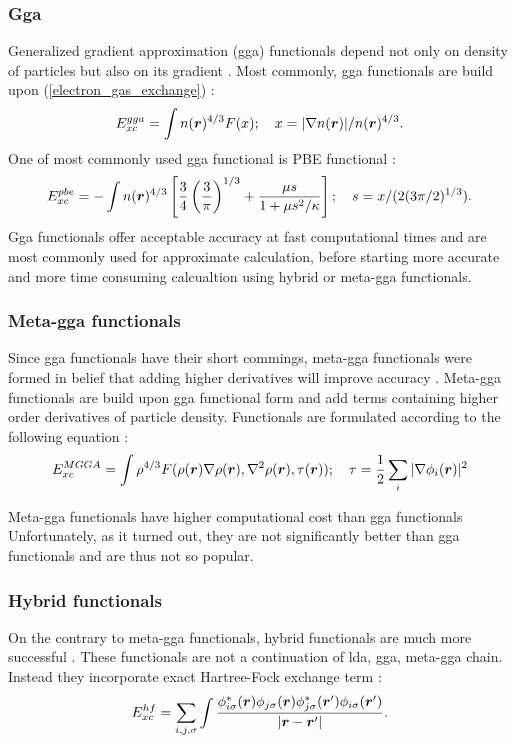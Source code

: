 \documentclass[openany, longbibliography,slovene,a4paper,12pt]{article}
\def\vec#1{\mbox{\boldmath$#1$}}
\begin{document}
\subsubsection{Gga}
Generalized gradient approximation (gga) functionals
depend not only on density of particles but also on its gradient \cite{challenges_den_fun_theor}. Most commonly,
gga functionals are build upon (\ref{electron_gas_exchange}) \cite{challenges_den_fun_theor}:
\begin{equation}
  E_{xc}^{gga}=\int n(\vec r)^{4/3}F(x);\quad x=|\nabla n(\vec r)|/n(\vec r)^{4/3}.
\end{equation}
One of most commonly used gga functional is PBE functional
\cite{challenges_den_fun_theor} \cite{challenges_den_fun_theor}:
\begin{equation}
  E_{xc}^{pbe}=-\int  n(\vec r)^{4/3}\left[ \frac{3}{4}\left(\frac{3}{\pi}\right)^{1/3} + \frac{\mu s}{1+ \mu s^2/\kappa} \right]; \quad s=x/(2(3\pi/2)^{1/3}).
\end{equation}
Gga functionals offer acceptable accuracy at fast computational times and are
most commonly used for approximate calculation, before starting more accurate
and more time consuming calcualtion using hybrid or meta-gga functionals.

\subsubsection{Meta-gga functionals}
Since gga functionals have their short commings, meta-gga functionals were formed
in belief that adding higher derivatives will improve accuracy
\cite{challenges_den_fun_theor}. Meta-gga functionals are build upon gga
functional form and add terms containing higher order derivatives of particle
density. Functionals are formulated according to the following equation
\cite{challenges_den_fun_theor}:
\begin{equation}
  E_{xc}^{MGGA}= \int \rho^{4/3}F(\rho(\vec r) \nabla \rho(\vec r), \nabla^2 \rho(\vec r), \tau(\vec r)); \quad \tau=\frac{1}{2}\sum_i |\nabla \phi_i(\vec r)|^2
   \end{equation}

Meta-gga functionals have higher computational cost than gga functionals
Unfortunately, as it turned out, they are not significantly better than gga
functionals and are thus not so popular.

\subsubsection{Hybrid functionals}
On the contrary to meta-gga functionals, hybrid functionals are much more
successful \cite{challenges_den_fun_theor}. These functionals are not a
continuation of lda, gga, meta-gga chain. Instead they incorporate exact
Hartree-Fock exchange term \cite{challenges_den_fun_theor}:
\begin{equation}
  E^{hf}_{xc}=\sum_ {i,j,\sigma}\int\frac{\phi^*_{i\sigma}(\vec r) \phi_{j\sigma}(\vec r) \phi^*_{j\sigma}(\vec r') \phi_{i\sigma}(\vec r')}{|\vec r - \vec r'|}.
\end{equation}
\end{document}
